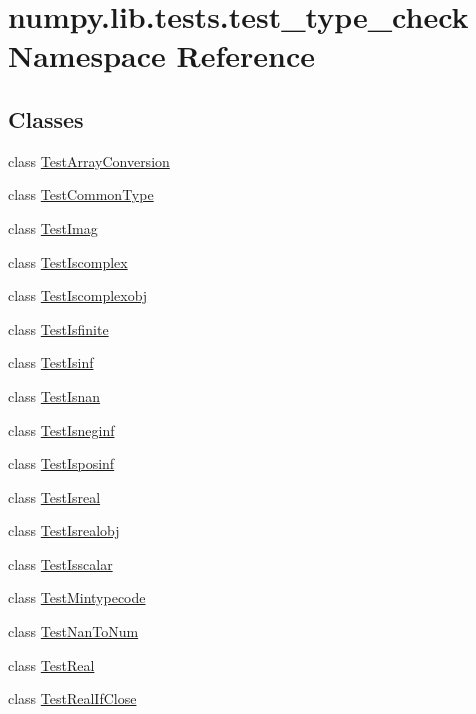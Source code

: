 \hypertarget{namespacenumpy_1_1lib_1_1tests_1_1test__type__check}{}\section{numpy.\+lib.\+tests.\+test\+\_\+type\+\_\+check Namespace Reference}
\label{namespacenumpy_1_1lib_1_1tests_1_1test__type__check}
\subsection*{Classes}
\begin{DoxyCompactItemize}
\item 
class \hyperlink{classnumpy_1_1lib_1_1tests_1_1test__type__check_1_1TestArrayConversion}{Test\+Array\+Conversion}
\item 
class \hyperlink{classnumpy_1_1lib_1_1tests_1_1test__type__check_1_1TestCommonType}{Test\+Common\+Type}
\item 
class \hyperlink{classnumpy_1_1lib_1_1tests_1_1test__type__check_1_1TestImag}{Test\+Imag}
\item 
class \hyperlink{classnumpy_1_1lib_1_1tests_1_1test__type__check_1_1TestIscomplex}{Test\+Iscomplex}
\item 
class \hyperlink{classnumpy_1_1lib_1_1tests_1_1test__type__check_1_1TestIscomplexobj}{Test\+Iscomplexobj}
\item 
class \hyperlink{classnumpy_1_1lib_1_1tests_1_1test__type__check_1_1TestIsfinite}{Test\+Isfinite}
\item 
class \hyperlink{classnumpy_1_1lib_1_1tests_1_1test__type__check_1_1TestIsinf}{Test\+Isinf}
\item 
class \hyperlink{classnumpy_1_1lib_1_1tests_1_1test__type__check_1_1TestIsnan}{Test\+Isnan}
\item 
class \hyperlink{classnumpy_1_1lib_1_1tests_1_1test__type__check_1_1TestIsneginf}{Test\+Isneginf}
\item 
class \hyperlink{classnumpy_1_1lib_1_1tests_1_1test__type__check_1_1TestIsposinf}{Test\+Isposinf}
\item 
class \hyperlink{classnumpy_1_1lib_1_1tests_1_1test__type__check_1_1TestIsreal}{Test\+Isreal}
\item 
class \hyperlink{classnumpy_1_1lib_1_1tests_1_1test__type__check_1_1TestIsrealobj}{Test\+Isrealobj}
\item 
class \hyperlink{classnumpy_1_1lib_1_1tests_1_1test__type__check_1_1TestIsscalar}{Test\+Isscalar}
\item 
class \hyperlink{classnumpy_1_1lib_1_1tests_1_1test__type__check_1_1TestMintypecode}{Test\+Mintypecode}
\item 
class \hyperlink{classnumpy_1_1lib_1_1tests_1_1test__type__check_1_1TestNanToNum}{Test\+Nan\+To\+Num}
\item 
class \hyperlink{classnumpy_1_1lib_1_1tests_1_1test__type__check_1_1TestReal}{Test\+Real}
\item 
class \hyperlink{classnumpy_1_1lib_1_1tests_1_1test__type__check_1_1TestRealIfClose}{Test\+Real\+If\+Close}
\end{DoxyCompactItemize}
